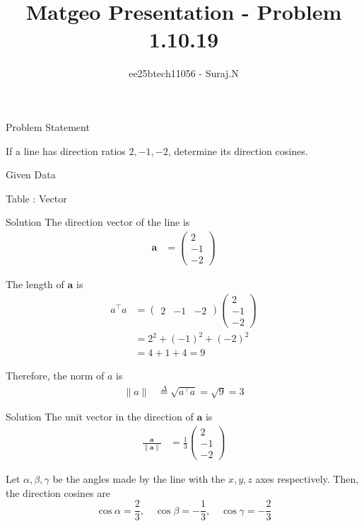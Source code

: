 \documentclass{beamer}
\title{Matgeo Presentation - Problem 1.10.19}
\author{ee25btech11056 - Suraj.N}
\numberwithin{equation}{section}
\providecommand{\brak}[1]{\ensuremath{\left(#1\right)}}
\theoremstyle{remark}
\providecommand{\norm}[1]{\lVert#1\rVert}
\newcommand{\myvec}[1]{\ensuremath{\begin{pmatrix}#1\end{pmatrix}}}
\let\vec\mathbf
\begin{document}
\begin{frame}
  \titlepage
\end{frame}

\begin{frame}{Problem Statement}

If a line has direction ratios $2,-1,-2$, determine its direction cosines.

\end{frame}


\begin{frame}{Given Data}
\begin{table}[h!]    
  \centering
  
  \caption*{Table : Vector}
  \label{1.10.19}
\end{table}

\end{frame}


\begin{frame}{Solution}
The direction vector of the line is
\begin{align*}
\vec{a} &= \myvec{2\\-1\\-2}
\end{align*}

The length of $\vec{a}$ is
\begin{align*}
a^\top a &= \myvec{2 & -1 & -2}\myvec{2\\-1\\-2} \\
&= 2^2 + \brak{-1}^2 + \brak{-2}^2 \\
&= 4 + 1 + 4 = 9
\end{align*}

Therefore, the norm of $a$ is
\begin{align*}
\norm{a} &\overset{\Delta}{=} \sqrt{a^\top a} = \sqrt{9} = 3
\end{align*} 
\end{frame}


\begin{frame}{Solution}
The unit vector in the direction of $\vec{a}$ is
\begin{align*}
\frac{\vec{a}}{\norm{\vec{a}}} 
&= \frac{1}{3}\myvec{2\\-1\\-2}
\end{align*}

Let $\alpha,\beta,\gamma$ be the angles made by the line with the $x,y,z$ axes respectively.  
Then, the direction cosines are
\[
\cos\alpha = \frac{2}{3}, \quad 
\cos\beta = -\frac{1}{3}, \quad 
\cos\gamma = -\frac{2}{3}
\]
\end{frame}
\end{document}
